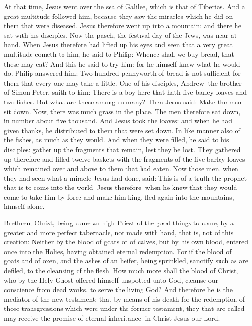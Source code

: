 \begin{multicols}{2}


At that time, Jesus went over the sea of Galilee, which is that of
Tiberias.  And a great multitude followed him, because they saw the miracles
which he did on them that were diseased.  Jesus therefore went up into a
mountain: and there he sat with his disciples.  Now the pasch, the festival day
of the Jews, was near at hand.  When Jesus therefore had lifted up his eyes and
seen that a very great multitude cometh to him, he said to Philip: Whence shall
we buy bread, that these may eat?  And this he said to try him: for he himself
knew what he would do.  Philip answered him: Two hundred pennyworth of bread is
not sufficient for them that every one may take a little.  One of his
disciples, Andrew, the brother of Simon Peter, saith to him: There is a boy
here that hath five barley loaves and two fishes.  But what are these among so
many?  Then Jesus said: Make the men sit down. Now, there was much grass in the
place. The men therefore sat down, in number about five thousand.  And Jesus
took the loaves: and when he had given thanks, he distributed to them that were
set down. In like manner also of the fishes, as much as they would.  And when
they were filled, he said to his disciples: gather up the fragments that
remain, lest they be lost.  They gathered up therefore and filled twelve
baskets with the fragments of the five barley loaves which remained over and
above to them that had eaten.  Now those men, when they had seen what a miracle
Jesus had done, said: This is of a truth the prophet that is to come into the
world.  Jesus therefore, when he knew that they would come to take him by force
and make him king, fled again into the mountains, himself alone.


\bigskip



Brethren, Christ, being come an high Priest of the good things to come, by a greater
and more perfect tabernacle, not made with hand, that is, not of this creation:
Neither by the blood of goats or of calves, but by his own blood, entered once
into the Holies, having obtained eternal redemption.   For if the blood of
goats and of oxen, and the ashes of an heifer, being sprinkled, sanctify such
as are defiled, to the cleansing of the flesh: How much more shall the blood of
Christ, who by the Holy Ghost offered himself unspotted unto God, cleanse our
conscience from dead works, to serve the living God?  And therefore he is the
mediator of the new testament: that by means of his death for the redemption of
those transgressions which were under the former testament, they that are
called may receive the promise of eternal inheritance, in Christ Jesus our Lord.



\end{multicols}
